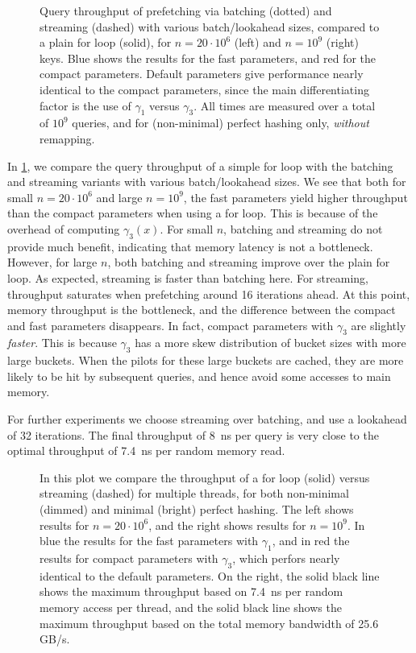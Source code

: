 \documentclass[a4paper,UKenglish,cleveref,thm-restate]{lipics-v2021}
\begin{document}
\begin{figure}[t]
\centering

\caption{\label{fig:batching}Query throughput of prefetching via batching (dotted) and streaming (dashed) with various batch/lookahead sizes, compared to a plain for loop (solid), for \(n=20\cdot 10^6\) (left) and \(n=10^9\) (right) keys. Blue shows the results for the fast parameters, and red for the compact parameters. Default parameters give performance nearly identical to the compact parameters, since the main differentiating factor is the use of \(\gamma_1\) versus \(\gamma_3\). All times are measured over a total of \(10^9\) queries, and for (non-minimal) perfect hashing only, \emph{without} remapping.}
\end{figure}


In \cref{fig:batching}, we compare the query throughput of a simple for loop with the
batching and streaming variants with various batch/lookahead sizes. We see that
both for small \(n=20\cdot 10^6\) and large \(n=10^9\), the fast parameters yield
higher throughput than the compact parameters when using a for loop. This is
because of the overhead of computing \(\gamma_3(x)\). For small \(n\), batching and
streaming do not provide much benefit, indicating that memory latency is not a
bottleneck. However, for large \(n\), both batching and streaming improve over the
plain for loop. As expected, streaming is faster than batching here. For
streaming, throughput saturates when prefetching around 16 iterations ahead. At
this point, memory throughput is the bottleneck, and the difference between the
compact and fast parameters disappears. In fact, compact parameters with
\(\gamma_3\) are slightly \emph{faster}. This is because \(\gamma_3\) has a more skew
distribution of bucket sizes with more large buckets. When the pilots for these
large buckets are cached, they are more likely to be hit by subsequent queries,
and hence avoid some accesses to main memory.

For further experiments we choose streaming over batching, and use a lookahead
of 32 iterations.
The final throughput of 8~ns per query is very close to the optimal throughput of
7.4~ns per random memory read.

\begin{figure}[t]
\centering

\caption{\label{fig:throughput}In this plot we compare the throughput of a for loop (solid) versus streaming (dashed) for multiple threads, for both non-minimal (dimmed) and minimal (bright) perfect hashing. The left shows results for \(n=20\cdot 10^6\), and the right shows results for \(n=10^9\). In blue the results for the fast parameters with \(\gamma_1\), and in red the results for compact parameters with \(\gamma_3\), which perfors nearly identical to the default parameters. On the right, the solid black line shows the maximum throughput based on 7.4~ns per random memory access per thread, and the solid black line shows the maximum throughput based on the total memory bandwidth of 25.6 GB/s.}
\vspace{-1em}
\end{figure}
\end{document}

